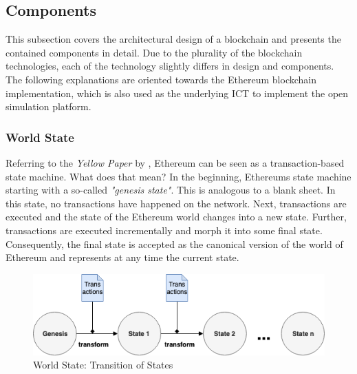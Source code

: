 \subsection{Components}
This subsection covers the architectural design of a blockchain and presents the 
contained components in detail. Due to the plurality of the blockchain technologies, 
each of the technology slightly differs in design and components. 
The following explanations are oriented towards the Ethereum blockchain 
implementation, which is also used as the underlying ICT to implement 
the open simulation platform.

\subsubsection{World State}
\label{sec:world_state}
Referring to the \textit{Yellow Paper} by , Ethereum 
can be seen as a transaction-based state machine. What does that mean? 
In the beginning, Ethereums state machine starting with a so-called 
\textit{"genesis state"}. This is analogous to a blank sheet. 
In this state, no transactions have happened on the network. 
Next, transactions are executed and the state of the Ethereum world 
changes into a new state. Further, transactions are executed incrementally 
and morph it into some final state. Consequently, the final state 
is accepted as the canonical version of the world of Ethereum and 
represents at any time the current state.

\begin{figure}[htbp]
	\centering
	\includegraphics[width=.75\linewidth]{./figures/state_transition.png}
	\caption{World State: Transition of States}
	\label{figure:state_transition}
\end{figure}

